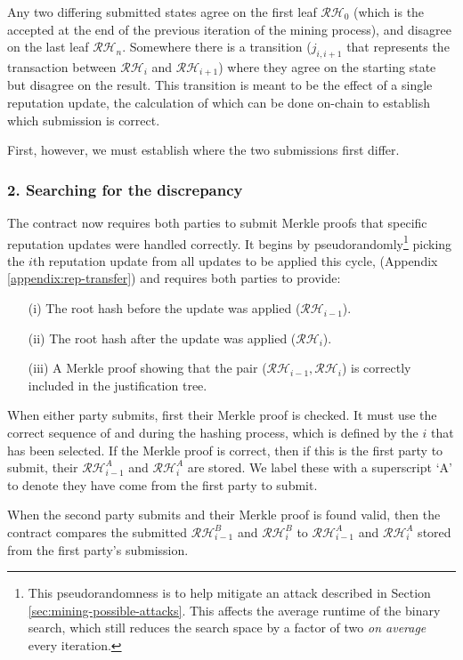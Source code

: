 Any two differing submitted states agree on the first leaf $\mathcal{RH}_0$ (which is the  accepted at the end of the previous iteration of the mining process), and disagree on the last leaf $\mathcal{RH}_n$. Somewhere there is a transition  ($j_{i,i+1}$ that represents the transaction between $\mathcal{RH}_i$ and $\mathcal{RH}_{i+1}$) where they agree on the starting state but disagree on the result. This transition is meant to be the effect of a single reputation update, the calculation of which can be done on-chain to establish which submission is correct.

First, however, we must establish where the two submissions first differ.

\subsubsection*{2. Searching for the discrepancy}
The contract now requires both parties to submit Merkle proofs that specific reputation updates were handled correctly. It begins by pseudorandomly\footnote{This pseudorandomness is to help mitigate an attack described in Section \ref{sec:mining-possible-attacks}. This affects the average runtime of the binary search, which still reduces the search space by a factor of two \emph{on average} every iteration.} picking the $i$th reputation update from all updates to be applied this cycle, (Appendix \ref{appendix:rep-transfer}) and requires both parties to provide:
\begin{itemize}
 \item[(i)] The root hash before the update was applied ($\mathcal{RH}_{i-1}$).
 \item[(ii)] The root hash after the update was applied ($\mathcal{RH}_i$).
 \item[(iii)] A Merkle proof showing that the pair ($\mathcal{RH}_{i-1}, \mathcal{RH}_i$) is correctly included in the justification tree.
\end{itemize}

When either party submits, first their Merkle proof is checked. It must use the correct sequence of  and  during the hashing process, which is defined by the $i$ that has been selected. If the Merkle proof is correct, then if this is the first party to submit, their $\mathcal{RH}^A_{i-1}$ and $\mathcal{RH}^A_{i}$ are stored. We label these with a superscript `A' to denote they have come from the first party to submit.

When the second party submits and their Merkle proof is found valid, then the contract compares the submitted $\mathcal{RH}^B_{i-1}$ and $\mathcal{RH}^B_{i}$ to $\mathcal{RH}^A_{i-1}$ and $\mathcal{RH}^A_{i}$ stored from the first party's submission.

